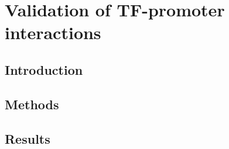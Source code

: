 \documentclass[../main.tex]{subfiles}
\begin{document}
\chapter{Validation of TF-promoter interactions}
\label{chapter3}
\section{Introduction}
\label{chapter3:introduction}

\section{Methods}
\label{chapter3:methods}

\section{Results}
\label{chapter3:results}
\end{document}
